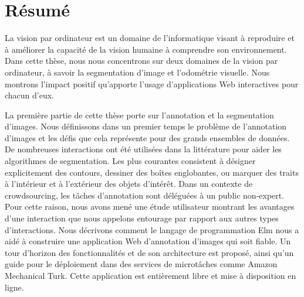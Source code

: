 \section*{Résumé}%
\label{sec:resume}

La vision par ordinateur est un domaine de l'informatique visant à reproduire et à améliorer
la capacité de la vision humaine à comprendre son environnement.
Dans cette thèse, nous nous concentrons sur deux domaines de la vision par ordinateur,
à savoir la segmentation d'image et l'odométrie visuelle.
Nous montrons l'impact positif qu'apporte l'usage
d'applications Web interactives pour chacun d'eux.

La première partie de cette thèse porte sur l'annotation et la segmentation d'images.
Nous définissons dans un premier temps le problème de l'annotation d'images
et les défis que cela représente pour des grands ensembles de données.
De nombreuses interactions ont été utilisées dans la littérature
pour aider les algorithmes de segmentation.
Les plus courantes consistent à désigner explicitement des contours,
dessiner des boîtes englobantes,
ou marquer des traits à l'intérieur et à l'extérieur des objets d'intérêt.
Dans un contexte de crowdsourcing, les tâches d'annotation sont déléguées
à un public non-expert.
Pour cette raison, nous avons mené une étude utilisateur montrant
les avantages d'une interaction que nous appelons entourage par rapport aux autres types d'interactions.
Nous décrivons comment le langage de programmation Elm nous a aidé à
construire une application Web d'annotation d'images qui soit fiable.
Un tour d'horizon des fonctionnalités et de son architecture est proposé,
ainsi qu'un guide pour le déploiement dans des services de microtâches comme Amazon Mechanical Turk.
Cette application est entièrement libre et mise à disposition en ligne.

